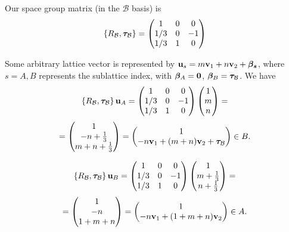 Our space group matrix (in the $\mathcal{B}$ basis) is
$$
\{R_{\mathcal{B}}, {\bm{\tau}}_{\mathcal{B}}\} =
\begin{pmatrix}
1 & 0 & 0 \\
1/3 & 0 & -1 \\
1/3 & 1 & 0 \\
\end{pmatrix}
$$

Some arbitrary lattice vector is represented by ${\vb{u}}_s = m {\vb{v}}_1 + n{\vb{v}}_2 + \bm{\beta_s}$, where $s = A, B$ represents the sublattice index, with $\bm{\beta}_A = {\vb{0}}$, $\bm{\beta}_B = {\bm{\tau}}_{\mathcal{B}}$. We have
$$
\{R_{\mathcal{B}}, {\bm{\tau}}_{\mathcal{B}}\} \, {\vb{u}}_A =
\begin{pmatrix}
1 & 0 & 0 \\
1/3 & 0 & -1 \\
1/3 & 1 & 0 \\
\end{pmatrix}
\begin{pmatrix}
1 \\ m \\ n
\end{pmatrix}
=
$$
$$
=
\begin{pmatrix}
1 \\ -n + \frac{1}{3} \\ m+n+\frac{1}{3}
\end{pmatrix}
=
\begin{pmatrix}
1 \\ -n {\vb{v}}_1 + (m+n) {\vb{v}}_2 + {\bm{\tau}}_{\mathcal{B}}
\end{pmatrix}
\in B.
$$

$$
\{R_{\mathcal{B}}, {\bm{\tau}}_{\mathcal{B}}\} \, {\vb{u}}_B =
\begin{pmatrix}
1 & 0 & 0 \\
1/3 & 0 & -1 \\
1/3 & 1 & 0 \\
\end{pmatrix}
\begin{pmatrix}
1 \\ m + \frac{1}{3} \\ n + \frac{1}{3}
\end{pmatrix}
=
$$
$$
=
\begin{pmatrix}
1 \\ -n \\ 1+m+n
\end{pmatrix}
=
\begin{pmatrix}
1 \\ -n {\vb{v}}_1 + (1+m+n) {\vb{v}}_2
\end{pmatrix}
\in A.
$$


